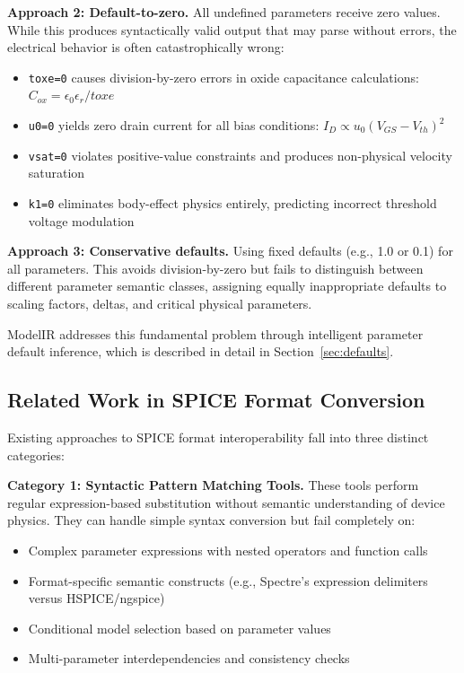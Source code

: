 \documentclass[10pt,twocolumn]{article}
\begin{document}
\textbf{Approach 2: Default-to-zero.} All undefined parameters receive zero values. While this produces syntactically valid output that may parse without errors, the electrical behavior is often catastrophically wrong:
\begin{itemize}
\item \texttt{toxe=0} causes division-by-zero errors in oxide capacitance calculations: $C_{ox} = \epsilon_0 \epsilon_r / toxe$
\item \texttt{u0=0} yields zero drain current for all bias conditions: $I_D \propto u_0 (V_{GS} - V_{th})^2$
\item \texttt{vsat=0} violates positive-value constraints and produces non-physical velocity saturation
\item \texttt{k1=0} eliminates body-effect physics entirely, predicting incorrect threshold voltage modulation
\end{itemize}

\textbf{Approach 3: Conservative defaults.} Using fixed defaults (e.g., 1.0 or 0.1) for all parameters. This avoids division-by-zero but fails to distinguish between different parameter semantic classes, assigning equally inappropriate defaults to scaling factors, deltas, and critical physical parameters.

ModelIR addresses this fundamental problem through intelligent parameter default inference, which is described in detail in Section~\ref{sec:defaults}.

\subsection{Related Work in SPICE Format Conversion}

Existing approaches to SPICE format interoperability fall into three distinct categories:

\textbf{Category 1: Syntactic Pattern Matching Tools.} These tools perform regular expression-based substitution without semantic understanding of device physics. They can handle simple syntax conversion but fail completely on:
\begin{itemize}
\item Complex parameter expressions with nested operators and function calls
\item Format-specific semantic constructs (e.g., Spectre's expression delimiters versus HSPICE/ngspice)
\item Conditional model selection based on parameter values
\item Multi-parameter interdependencies and consistency checks
\end{itemize}
\end{document}
